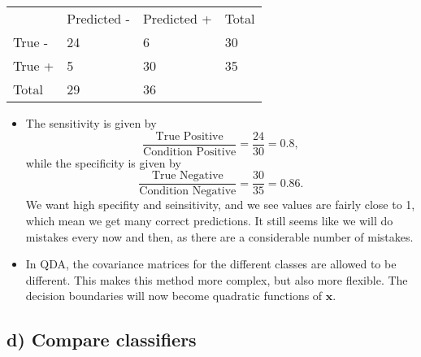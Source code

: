 \documentclass[]{article}
\begin{document}
\newpage

\begin{longtable}[]{@{}llll@{}}
\toprule
& Predicted - & Predicted + & Total\tabularnewline
True - & 24 & 6 & 30\tabularnewline
True + & 5 & 30 & 35\tabularnewline
Total & 29 & 36 &\tabularnewline
\bottomrule
\end{longtable}

\begin{itemize}
\item
  The sensitivity is given by
  \[\frac{\text{True Positive}}{\text{Condition Positive}}=\frac{24}{30}=0.8,\]
  while the specificity is given by
  \[\frac{\text{True Negative}}{\text{Condition Negative}}=\frac{30}{35}=0.86.\]
  We want high specifity and seinsitivity, and we see values are fairly
  close to 1, which mean we get many correct predictions. It still seems
  like we will do mistakes every now and then, as there are a
  considerable number of mistakes.
\item
  In QDA, the covariance matrices for the different classes are allowed
  to be different. This makes this method more complex, but also more
  flexible. The decision boundaries will now become quadratic functions
  of \(\boldsymbol{x}\).
\end{itemize}

\subsection{d) Compare classifiers}\label{d-compare-classifiers}
\end{document}
